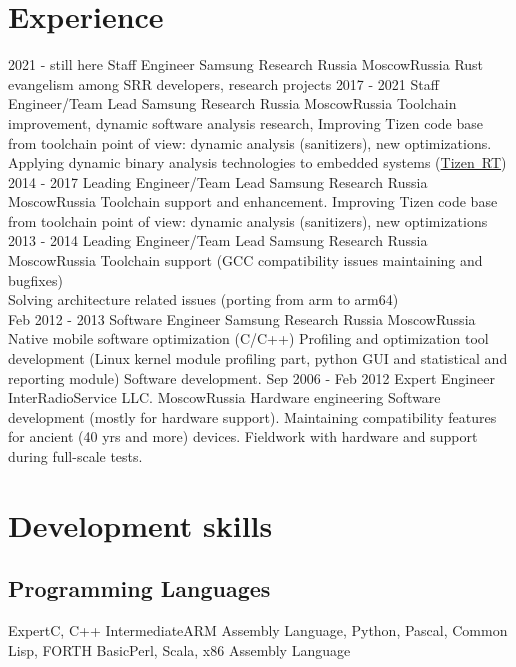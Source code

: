 \documentclass[11pt,a4paper]{moderncv}
\begin{document}
\section{Experience}
\cventry
  {2021 - still here}
  {Staff Engineer}
  {Samsung Research Russia}
  {Moscow}{Russia}
  {Rust evangelism among SRR developers, research projects}
\cventry
  {2017 - 2021}
  {Staff Engineer/Team Lead}
  {Samsung Research Russia}
  {Moscow}{Russia}
  {Toolchain improvement, dynamic software analysis research, Improving Tizen
    code base from toolchain point of view: dynamic analysis (sanitizers), new
    optimizations. Applying dynamic binary analysis technologies to embedded
    systems (\href{https://github.com/Samsung/TizenRT}{Tizen~RT})}
\cventry
  {2014 - 2017}
  {Leading Engineer/Team Lead}
  {Samsung Research Russia}
  {Moscow}{Russia}
  {Toolchain support and enhancement. Improving Tizen code base from toolchain point of view: dynamic analysis
    (sanitizers), new optimizations}
\cventry
  {2013 - 2014}
  {Leading Engineer/Team Lead}
  {Samsung Research Russia}
  {Moscow}{Russia}
  {Toolchain support (GCC compatibility issues maintaining and bugfixes)\\
Solving architecture related issues (porting from arm to arm64)\\}
\cventry
  {Feb 2012 - 2013}
  {Software Engineer}
  {Samsung Research Russia}
  {Moscow}{Russia}
  {Native mobile software optimization (C/C++)\newline{}
Profiling and optimization tool development (Linux kernel module profiling part, python GUI and statistical and reporting module)\newline{}
Software development.}
\cventry
  {Sep 2006 - Feb 2012}
  {Expert Engineer}
  {InterRadioService LLC.}
  {Moscow}{Russia}
  {Hardware engineering\newline{}
Software development (mostly for hardware support).\newline{}
Maintaining compatibility features for ancient (40 yrs and more) devices.\newline{}
Fieldwork with hardware and support during full-scale tests.\newline{}}

\section{Development skills}
\subsection{Programming Languages}
\cvitem
  {Expert}{C, C++}
\cvitem
  {Intermediate}{ARM Assembly Language, Python, Pascal, Common Lisp, FORTH}
\cvitem
  {Basic}{Perl, Scala, x86 Assembly Language}
\end{document}
